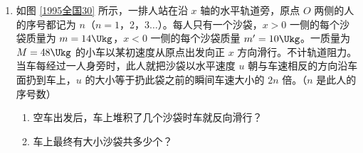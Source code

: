 \documentclass[\gkver]{gaokaozhenti}
\begin{document}
\begin{enumerate}
{由等压升温过程得

$\frac{H_{0}}{T_{0}+\Delta T}=\frac{H_{1}}{T_{1}}$ ①，

联系初态和终态，由理想气体状态方程得

$\frac{H_{0}}{T_{0}}=\frac{H_{2}}{T_{2}}$ ②，

利用 $T_{1}=T_{2}$，由①、②两式解得

$T_{2}=\frac{H_{1}H_{2}}{H_{0}(H_{2}-H_{1})}\Delta T$ ③

代入数值得 $T_{2}=540\UK$

评分标准：全题 12 分。求得①式给 4 分；求得②式给 5 分；正确求得③式给 2 分，结果正确再给 1 分（若利用①、②式得出正确结果而未写③式的，也给这 3 分）。
}

\item
如图 \ref{1995全国30} 所示，一排人站在沿 $x$ 轴的水平轨道旁，原点 $O$ 两侧的人的序号都记为 $n$（$n=1$，2，3$\ldots$）。每人只有一个沙袋，$x>0$ 一侧的每个沙袋质量为 $m=14\Ukg$，$x<0$ 一侧的每个沙袋质量 $m'=10\Ukg$。一质量为 $M=48\Ukg$ 的小车以某初速度从原点出发向正 $x$ 方向滑行。不计轨道阻力。当车每经过一人身旁时，此人就把沙袋以水平速度 $u$ 朝与车速相反的方向沿车面扔到车上，$u$ 的大小等于扔此袋之前的瞬间车速大小的 $2n$ 倍。（$n$ 是此人的序号数）
\begin{enumerate}
	\item
	空车出发后，车上堆积了几个沙袋时车就反向滑行？
	\item
	车上最终有大小沙袋共多少个？
\end{enumerate}


\end{enumerate}
\end{document}
